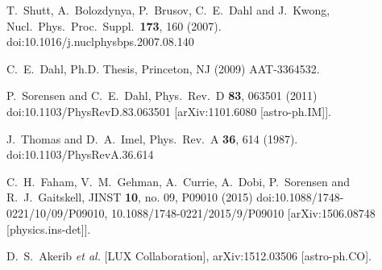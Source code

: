 \documentclass[article]{revtex4-1}[11pt]
\begin{document}







\begin{thebibliography}{99}

  T.~Shutt, A.~Bolozdynya, P.~Brusov, C.~E.~Dahl and J.~Kwong, %
  Nucl.\ Phys.\ Proc.\ Suppl.\  {\bf 173}, 160 (2007).
  doi:10.1016/j.nuclphysbps.2007.08.140

  C.~E.~Dahl, 
  Ph.D. Thesis, Princeton, NJ (2009) %
  AAT-3364532.

  P.~Sorensen and C.~E.~Dahl,
  Phys.\ Rev.\ D {\bf 83}, 063501 (2011)
  doi:10.1103/PhysRevD.83.063501
  [arXiv:1101.6080 [astro-ph.IM]].

  J.~Thomas and D.~A.~Imel,
  Phys.\ Rev.\ A {\bf 36}, 614 (1987).
  doi:10.1103/PhysRevA.36.614



  C.~H.~Faham, V.~M.~Gehman, A.~Currie, A.~Dobi, P.~Sorensen and R.~J.~Gaitskell,
  JINST {\bf 10}, no. 09, P09010 (2015)
  doi:10.1088/1748-0221/10/09/P09010, 10.1088/1748-0221/2015/9/P09010
  [arXiv:1506.08748 [physics.ins-det]].
  
  D.~S.~Akerib {\it et al.} [LUX Collaboration],
  arXiv:1512.03506 [astro-ph.CO].
  
\end{thebibliography}
\end{document}
